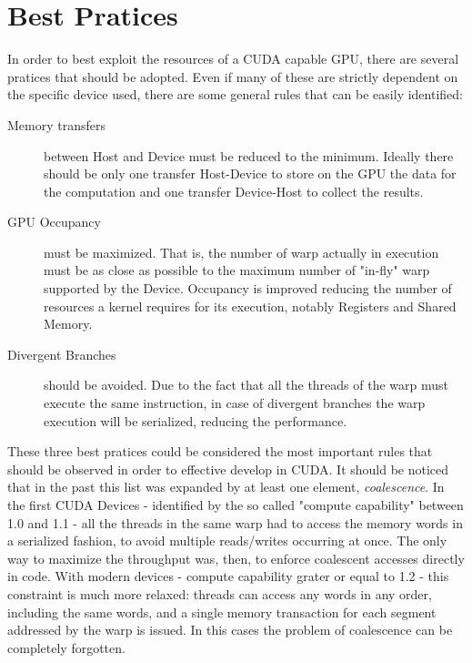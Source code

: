 \section{Best Pratices}
In order to best exploit the resources of a CUDA capable GPU, there are several pratices that should be adopted. Even if many of these are strictly dependent on the specific device used, there are some general rules that can be easily identified:
\begin{description}
\item[Memory transfers] between Host and Device must be reduced to the minimum. Ideally there should be only one transfer Host-Device to store on the GPU the data for the computation and one transfer Device-Host to collect the results.
\item[GPU Occupancy] must be maximized. That is, the number of warp actually in execution must be as close as possible to the maximum number of "in-fly" warp supported by the Device. Occupancy is improved reducing the number of resources a kernel requires for its execution, notably Registers and Shared Memory.
\item[Divergent Branches] should be avoided. Due to the fact that all the threads of the warp must execute the same instruction, in case of divergent branches the warp execution will be serialized, reducing the performance.
\end{description}
These three best pratices could be considered the most important rules that should be observed in order to effective develop in CUDA. It should be noticed that in the past this list was expanded by at least one element, \textsl{coalescence}. In the first CUDA Devices - identified by the so called "compute capability" between 1.0 and 1.1 - all the threads in the same warp had to access the memory words in a serialized fashion, to avoid multiple reads/writes occurring at once. The only way to maximize the throughput was, then, to enforce coalescent accesses directly in code.
With modern devices - compute capability grater or equal to 1.2 - this constraint is much more relaxed: threads can access any words in any order, including the same words, and a single memory transaction for each segment addressed by the warp is issued. In this cases the problem of coalescence can be completely forgotten.
